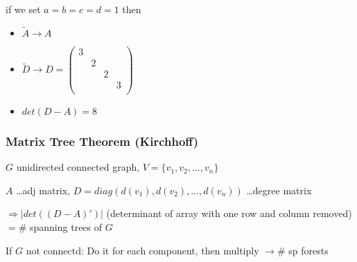 if we set $a=b=c=d=1$ then

\begin{itemize}
	\item $\tilde A \rightarrow A$
	\item $\tilde D \rightarrow D = 
		\begin{pmatrix}3 \\ & 2 \\ & & 2 \\ & & & 3 \\ \end{pmatrix}$
	\item $det(D-A) = 8$
\end{itemize}

\subsubsection*{Matrix Tree Theorem (Kirchhoff)}
$G$ unidirected connected graph, $V = \{v_1, v_2, \ldots ,v_n\}$

$A$ \ldots adj matrix, $D = diag(d(v_1), d(v_2), \ldots , d(v_n))$ \ldots degree matrix

$\Rightarrow |det((D-A)') | $ (determinant of array with one row and column removed) $ = \#$ spanning trees of $G$

If $G$ not connectd: Do it for each component, then multiply $\rightarrow \#$ sp forests


